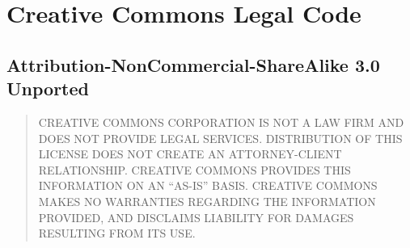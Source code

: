 \begin{comment}
\end{comment}

\section{Creative Commons Legal Code}

\subsection{Attribution-NonCommercial-ShareAlike 3.0 Unported}





\begin{quotation}
CREATIVE COMMONS CORPORATION IS NOT A LAW FIRM AND DOES
NOT PROVIDE LEGAL SERVICES. DISTRIBUTION OF THIS LICENSE
DOES NOT CREATE AN ATTORNEY-CLIENT RELATIONSHIP. CREATIVE
COMMONS PROVIDES THIS INFORMATION ON AN ``AS-IS'' BASIS.
CREATIVE COMMONS MAKES NO WARRANTIES REGARDING THE
INFORMATION PROVIDED, AND DISCLAIMS LIABILITY FOR DAMAGES
RESULTING FROM ITS USE.
\end{quotation}

